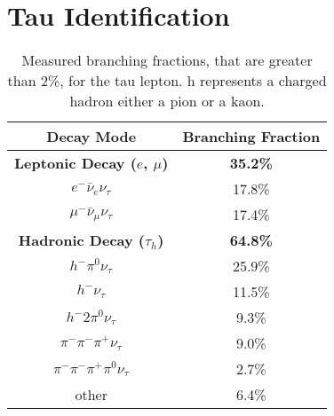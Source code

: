 \section{Tau Identification}
\label{sec:tau_identification}

\begin{table}[h]
    \centering
    \begin{tabular}{cc}
         \hline
         Decay Mode & Branching Fraction  \\
         \hline
         \hline
         \textbf{Leptonic Decay (\(e\), \(\mu\))} & \textbf{35.2\%} \\
         \(e^- \bar{\nu}_e \nu_\tau \) & 17.8\% \\
         \(\mu^- \bar{\nu}_\mu \nu_\tau \) & 17.4\% \\
         \hline
         \textbf{Hadronic Decay (\(\tau_h\))} & \textbf{64.8\%} \\
         \(h^- \pi^0 \nu_\tau \) & 25.9\% \\
         \(h^- \nu_\tau\) & 11.5\% \\
         \(h^- 2\pi^0 \nu_\tau\) & 9.3\% \\
         \(\pi^- \pi^- \pi^+ \nu_\tau\) & 9.0\% \\
         \(\pi^- \pi^- \pi^+ \pi^0 \nu_\tau\) & 2.7\% \\
         other & 6.4\% \\
         \hline
    \end{tabular}
    \caption{Measured branching fractions, that are greater than 2\%, for the tau lepton. h represents a charged hadron either a pion or a kaon.}
    \label{tab:tau_decay}
\end{table}